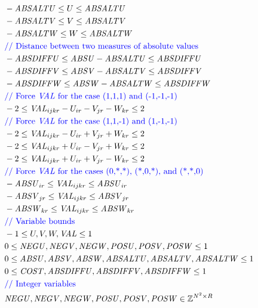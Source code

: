 \documentclass{article}
\begin{document}
{\begin{align}
\begin{split}
    & \quad -\mathit{ABSALTU} \leq U \leq \mathit{ABSALTU}  \\
    & \quad -\mathit{ABSALTV} \leq V \leq \mathit{ABSALTV}  \\
    & \quad -\mathit{ABSALTW} \leq W \leq \mathit{ABSALTW}  \\
    & \quad \mbox{\color{blue}// Distance between two measures of absolute values} \\
    & \quad -\mathit{ABSDIFFU} \leq \mathit{ABSU} - \mathit{ABSALTU} \leq \mathit{ABSDIFFU}  \\
    & \quad -\mathit{ABSDIFFV} \leq \mathit{ABSV} - \mathit{ABSALTV} \leq \mathit{ABSDIFFV}  \\
    & \quad -\mathit{ABSDIFFW} \leq \mathit{ABSW} - \mathit{ABSALTW} \leq \mathit{ABSDIFFW}  \\
    & \quad \mbox{\color{blue}// Force $\mathit{VAL}$ for the case (1,1,1) and (-1,-1,-1)} \\
    & \quad -2 \leq \mathit{VAL}_{ijkr} - U_{ir} - V_{jr} - W_{kr} \leq 2 \\
    & \quad \mbox{\color{blue}// Force $\mathit{VAL}$ for the case (1,1,-1) and (1,-1,-1)} \\
    & \quad -2 \leq \mathit{VAL}_{ijkr} - U_{ir} + V_{jr} + W_{kr} \leq 2 \\
    & \quad -2 \leq \mathit{VAL}_{ijkr} + U_{ir} - V_{jr} + W_{kr} \leq 2 \\
    & \quad -2 \leq \mathit{VAL}_{ijkr} + U_{ir} + V_{jr} - W_{kr} \leq 2 \\
    & \quad \mbox{\color{blue}// Force $\mathit{VAL}$ for the cases (0,*,*), (*,0,*), and (*,*,0)} \\
    & \quad -\mathit{ABSU}_{ir} \leq \mathit{VAL}_{ijkr} \leq \mathit{ABSU}_{ir} \\
    & \quad -\mathit{ABSV}_{jr} \leq \mathit{VAL}_{ijkr} \leq \mathit{ABSV}_{jr} \\
    & \quad -\mathit{ABSW}_{kr} \leq \mathit{VAL}_{ijkr} \leq \mathit{ABSW}_{kr} \\
    & \quad \mbox{\color{blue}// Variable bounds} \\
    & \quad -1 \leq U, V, W, \mathit{VAL} \leq 1 \\
    & \quad 0 \leq \mathit{NEGU}, \mathit{NEGV}, \mathit{NEGW}, \mathit{POSU}, \mathit{POSV}, \mathit{POSW} \leq 1 \\
    & \quad 0 \leq \mathit{ABSU}, \mathit{ABSV}, \mathit{ABSW}, \mathit{ABSALTU}, \mathit{ABSALTV}, \mathit{ABSALTW} \leq 1 \\
    & \quad 0 \leq \mathit{COST}, \mathit{ABSDIFFU}, \mathit{ABSDIFFV}, \mathit{ABSDIFFW} \leq 1 \\
    & \quad \mbox{\color{blue}// Integer variables} \\
    & \quad \mathit{NEGU}, \mathit{NEGV}, \mathit{NEGW}, \mathit{POSU}, \mathit{POSV}, \mathit{POSW} \in \mathbb{Z}^{N^2 \times R}
    \end{split}
\end{align}
}
\end{document}
